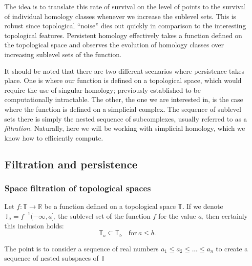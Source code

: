 The idea is to translate this rate of survival on the level of points to the survival of individual homology classes whenever we increase the sublevel sets. This is robust since topological ``noise'' dies out quickly in comparison to the interesting topological features. Persistent homology effectively takes a function defined on the topological space and observes the evolution of homology classes over increasing sublevel sets of the function.

It should be noted that there are two different scenarios where persistence takes place. One is where our function is defined on a topological space, which would require the use of singular homology; previously established to be computationally intractable. The other, the one we are interested in, is the case where the function is defined on a simplicial complex. The sequence of sublevel sets there is simply the nested sequence of subcomplexes, usually referred to as a \textit{filtration}. Naturally, here we will be working with simplicial homology, which we know how to efficiently compute.

\subsection{Filtration and persistence}
\subsubsection{Space filtration of topological spaces}

Let $f: \mathbb{T} \to \mathbb{R}$ be a function defined on a topological space $\mathbb{T}$. If we denote $\mathbb{T}_{a} = f^{-1}(-\infty, a]$, the sublevel set of the function $f$ for the value $a$, then certainly this inclusion holds:
  \begin{equation*}
    \mathbb{T}_{a} \subseteq \mathbb{T}_{b} \quad \text{for}\: a \leq b.
  \end{equation*}

  The point is to consider a sequence of real numbers $a_{1} \leq a_{2} \leq \ldots \leq a_{n}$ to create a sequence of nested subspaces of $\mathbb{T}$

  \begin{figure}[h]
    \centering


  \end{figure}

